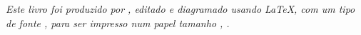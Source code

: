 \cleardoublepage

\null
\vfill
\newpage

\null
\vfill
\thispagestyle{empty}


{\normalsize \it Este livro foi produzido por \myauthor, editado e diagramado usando \LaTeX,
com um tipo de fonte \showfont,
para ser impresso num papel tamanho \imprimirpapersize,  \imprimirdata.
\vspace*{4pt}}







